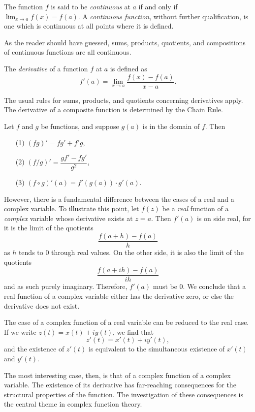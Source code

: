 \begin{definition}
	The function $f$ is said to be \emph{continuous} at $a$ if and only if $\lim_{x \rightarrow a}f(x)=f(a)$. A \emph{continuous function}, without further qualification, is one which is continuous at all points where it is defined.
\end{definition}

As the reader should have guessed, sums, products, quotients, and compositions of continuous functions are all continuous.

\begin{definition}
	The \emph{derivative} of a function $f$ at $a$ is defined as $$f'(a)=\lim_{x \rightarrow a}\dfrac{f(x)-f(a)}{x-a}.$$
\end{definition}

The usual rules for sums, products, and quotients concerning derivatives apply. The derivative of a composite function is determined by the Chain Rule.
\begin{proposition}
	Let $f$ and $g$ be functions, and suppose $g(a)$ is in the domain of $f$. Then
	\begin{enumerate}
		\item[(1)] $(fg)'=fg'+f'g$,
		\item[(2)] $(f/g)'=\dfrac{gf'-fg'}{g^2}$,
		\item[(3)] $(f \circ g)'(a)=f'(g(a)) \cdot g'(a)$.
	\end{enumerate}
\end{proposition}

However, there is a fundamental difference between the cases of a real and a complex variable. To illustrate this point, let $f(z)$ be a \textit{real} function of a \textit{complex} variable whose derivative exists at $z=a$. Then $f'(a)$ is on side real, for it is the limit of the quotients $$\dfrac{f(a+h)-f(a)}{h}$$ as $h$ tends to $0$ through real values. On the other side, it is also the limit of the quotients $$\dfrac{f(a+ih)-f(a)}{ih}$$ and as such purely imaginary. Therefore, $f'(a)$ must be $0$. We conclude that a real function of a complex variable either has the derivative zero, or else the derivative does not exist.

The case of a complex function of a real variable can be reduced to the real case. If we write $z(t)=x(t)+iy(t)$, we find that $$z'(t)=x'(t)+iy'(t),$$ and the existence of $z'(t)$ is equivalent to the simultaneous existence of $x'(t)$ and $y'(t)$.

The most interesting case, then, is that of a complex function of a complex variable. The existence of its derivative has far-reaching consequences for the structural properties of the function. The investigation of these consequences is the central theme in complex function theory.

